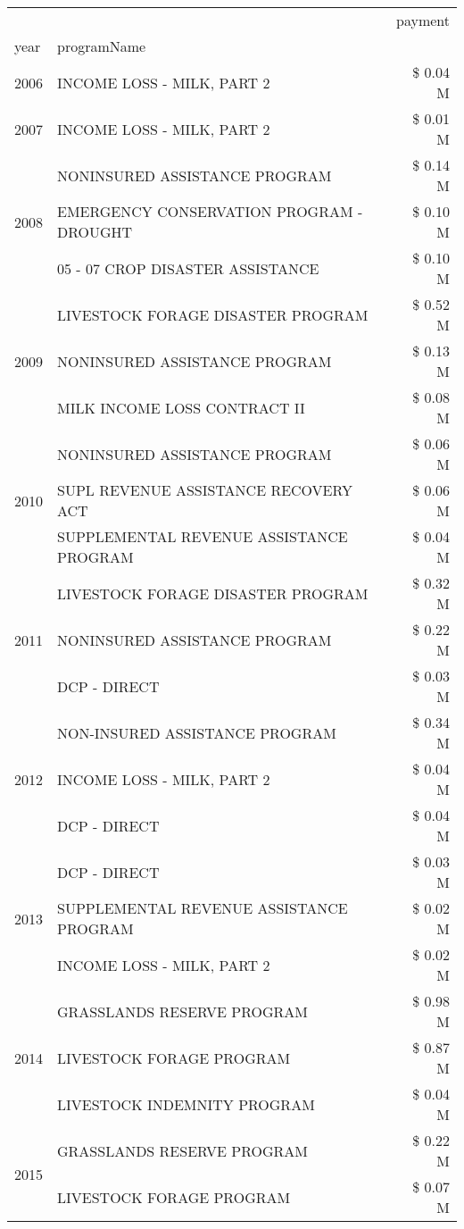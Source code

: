 \begin{tabular}{llr}
\toprule
 &  & payment \\
year & programName &  \\
\midrule
2006 & INCOME LOSS - MILK, PART 2 & \$ 0.04 M \\
\cline{1-3}
2007 & INCOME LOSS - MILK, PART 2 & \$ 0.01 M \\
\cline{1-3}
\multirow[t]{3}{*}{2008} & NONINSURED ASSISTANCE PROGRAM & \$ 0.14 M \\
 & EMERGENCY CONSERVATION PROGRAM - DROUGHT & \$ 0.10 M \\
 & 05 - 07 CROP DISASTER ASSISTANCE & \$ 0.10 M \\
\cline{1-3}
\multirow[t]{3}{*}{2009} & LIVESTOCK FORAGE DISASTER  PROGRAM & \$ 0.52 M \\
 & NONINSURED ASSISTANCE PROGRAM & \$ 0.13 M \\
 & MILK INCOME LOSS CONTRACT II & \$ 0.08 M \\
\cline{1-3}
\multirow[t]{3}{*}{2010} & NONINSURED ASSISTANCE PROGRAM & \$ 0.06 M \\
 & SUPL REVENUE ASSISTANCE RECOVERY ACT & \$ 0.06 M \\
 & SUPPLEMENTAL REVENUE ASSISTANCE PROGRAM & \$ 0.04 M \\
\cline{1-3}
\multirow[t]{3}{*}{2011} & LIVESTOCK FORAGE DISASTER PROGRAM & \$ 0.32 M \\
 & NONINSURED ASSISTANCE PROGRAM & \$ 0.22 M \\
 & DCP - DIRECT & \$ 0.03 M \\
\cline{1-3}
\multirow[t]{3}{*}{2012} & NON-INSURED ASSISTANCE PROGRAM & \$ 0.34 M \\
 & INCOME LOSS - MILK, PART 2 & \$ 0.04 M \\
 & DCP - DIRECT & \$ 0.04 M \\
\cline{1-3}
\multirow[t]{3}{*}{2013} & DCP - DIRECT & \$ 0.03 M \\
 & SUPPLEMENTAL REVENUE ASSISTANCE PROGRAM & \$ 0.02 M \\
 & INCOME LOSS - MILK, PART 2 & \$ 0.02 M \\
\cline{1-3}
\multirow[t]{3}{*}{2014} & GRASSLANDS RESERVE PROGRAM & \$ 0.98 M \\
 & LIVESTOCK FORAGE PROGRAM & \$ 0.87 M \\
 & LIVESTOCK INDEMNITY PROGRAM & \$ 0.04 M \\
\cline{1-3}
\multirow[t]{3}{*}{2015} & GRASSLANDS RESERVE PROGRAM & \$ 0.22 M \\
 & LIVESTOCK FORAGE PROGRAM & \$ 0.07 M \\

\end{tabular}
